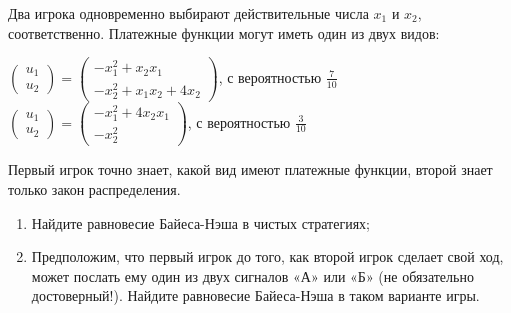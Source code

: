 \begin{problem}

Два игрока одновременно выбирают действительные числа  $x_{1} $  и  $x_{2} $, соответственно.
Платежные функции могут иметь один из двух видов:

 $\left(\begin{array}{l} {u_{1} } \\ {u_{2} } \end{array}\right)=\left(\begin{array}{l} {-x_{1}^{2} +x_{2} x_{1} } \\ {-x_{2}^{2} +x_{1} x_{2} +4x_{2} } \end{array}\right)$, с вероятностью  $\frac{7}{10} $ \\
 $\left(\begin{array}{l} {u_{1} } \\ {u_{2} } \end{array}\right)=\left(\begin{array}{l} {-x_{1}^{2} +4x_{2} x_{1} } \\ {-x_{2}^{2} } \end{array}\right)$, с вероятностью  $\frac{3}{10} $ \par
Первый игрок точно знает, какой вид имеют платежные функции, второй знает только закон распределения.\par
\begin{enumerate}
\item	Найдите равновесие Байеса-Нэша в чистых стратегиях;\par
\item Предположим, что первый игрок до того, как второй игрок сделает свой ход, может послать ему один из двух сигналов «А» или «Б» (не обязательно достоверный!). Найдите равновесие Байеса-Нэша в таком варианте игры.\par
\end{enumerate}


\begin{sol}

\end{sol}
\end{problem}





